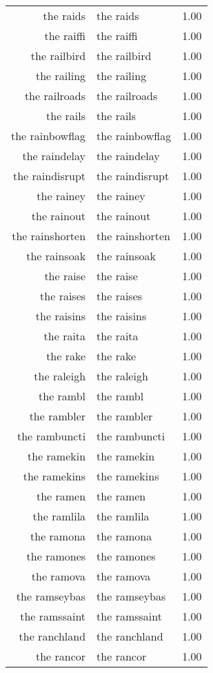\begin{table}[ht]
\begin{tabular}{rlr}
  the raids & the raids & 1.00 \\ 
  the raiffi & the raiffi & 1.00 \\ 
  the railbird & the railbird & 1.00 \\ 
  the railing & the railing & 1.00 \\ 
  the railroads & the railroads & 1.00 \\ 
  the rails & the rails & 1.00 \\ 
  the rainbowflag & the rainbowflag & 1.00 \\ 
  the raindelay & the raindelay & 1.00 \\ 
  the raindisrupt & the raindisrupt & 1.00 \\ 
  the rainey & the rainey & 1.00 \\ 
  the rainout & the rainout & 1.00 \\ 
  the rainshorten & the rainshorten & 1.00 \\ 
  the rainsoak & the rainsoak & 1.00 \\ 
  the raise & the raise & 1.00 \\ 
  the raises & the raises & 1.00 \\ 
  the raisins & the raisins & 1.00 \\ 
  the raita & the raita & 1.00 \\ 
  the rake & the rake & 1.00 \\ 
  the raleigh & the raleigh & 1.00 \\ 
  the rambl & the rambl & 1.00 \\ 
  the rambler & the rambler & 1.00 \\ 
  the rambuncti & the rambuncti & 1.00 \\ 
  the ramekin & the ramekin & 1.00 \\ 
  the ramekins & the ramekins & 1.00 \\ 
  the ramen & the ramen & 1.00 \\ 
  the ramlila & the ramlila & 1.00 \\ 
  the ramona & the ramona & 1.00 \\ 
  the ramones & the ramones & 1.00 \\ 
  the ramova & the ramova & 1.00 \\ 
  the ramseybas & the ramseybas & 1.00 \\ 
  the ramssaint & the ramssaint & 1.00 \\ 
  the ranchland & the ranchland & 1.00 \\ 
  the rancor & the rancor & 1.00 \\ 

\end{tabular}
\end{table}

